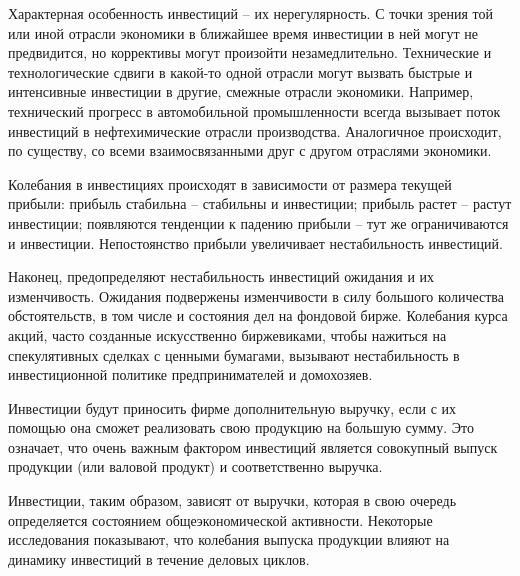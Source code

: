 Характерная особенность инвестиций -- их нерегулярность. С точки зрения той или
иной отрасли экономики в ближайшее время инвестиции в ней могут не предвидится,
но коррективы могут произойти незамедлительно. Технические и технологические
сдвиги в какой-то одной отрасли могут вызвать быстрые и интенсивные инвестиции
в другие, смежные отрасли экономики. Например, технический прогресс в
автомобильной промышленности всегда вызывает поток инвестиций в нефтехимические
отрасли производства. Аналогичное происходит, по существу, со всеми
взаимосвязанными друг с другом отраслями экономики.

Колебания в инвестициях происходят в зависимости от размера текущей прибыли:
прибыль стабильна -- стабильны и инвестиции; прибыль растет -- растут
инвестиции; появляются тенденции к падению прибыли -- тут же ограничиваются и
инвестиции. Непостоянство прибыли увеличивает нестабильность инвестиций.

Наконец, предопределяют нестабильность инвестиций ожидания и их изменчивость.
Ожидания подвержены изменчивости в силу большого количества обстоятельств, в
том числе и состояния дел на фондовой бирже. Колебания курса акций, часто
созданные искусственно биржевиками, чтобы нажиться на спекулятивных сделках с
ценными бумагами, вызывают нестабильность в инвестиционной политике
предпринимателей и домохозяев.

Инвестиции будут приносить фирме дополнительную выручку, если с их помощью она
сможет реализовать свою продукцию на большую сумму. Это означает, что очень
важным фактором инвестиций является совокупный выпуск продукции (или валовой
продукт) и соответственно выручка.

Инвестиции, таким образом, зависят от выручки, которая в свою очередь
определяется состоянием общеэкономической активности. Некоторые исследования
показывают, что колебания выпуска продукции влияют на динамику инвестиций в
течение деловых циклов.

